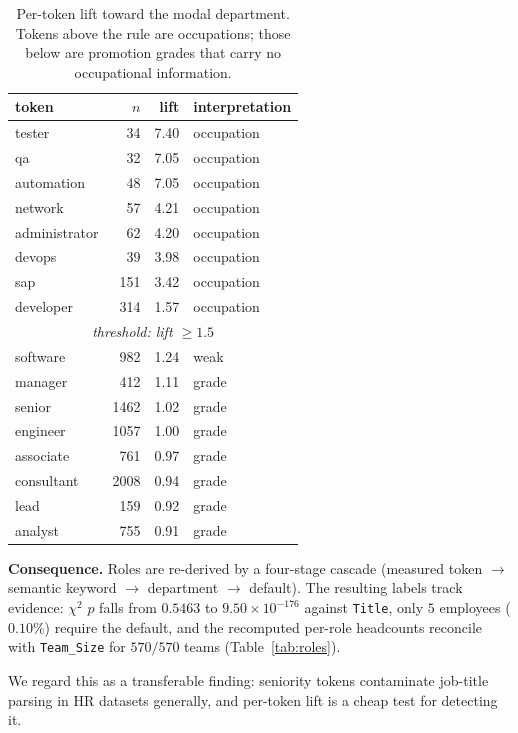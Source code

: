\documentclass[conference]{IEEEtran}
\begin{document}
\begin{table}[t]
\caption{Per-token lift toward the modal department. Tokens above the rule are
occupations; those below are promotion grades that carry no occupational
information.}
\label{tab:lift}
\centering\small
\begin{tabular}{lrrl}
\toprule
token & $n$ & lift & interpretation\\
\midrule
tester        &   34 & 7.40 & occupation\\
qa            &   32 & 7.05 & occupation\\
automation    &   48 & 7.05 & occupation\\
network       &   57 & 4.21 & occupation\\
administrator &   62 & 4.20 & occupation\\
devops        &   39 & 3.98 & occupation\\
sap           &  151 & 3.42 & occupation\\
developer     &  314 & 1.57 & occupation\\
\midrule
\multicolumn{4}{c}{\emph{threshold: lift $\geq 1.5$}}\\
\midrule
software      &  982 & 1.24 & weak\\
manager       &  412 & 1.11 & grade\\
senior        & 1462 & 1.02 & grade\\
engineer      & 1057 & 1.00 & grade\\
associate     &  761 & 0.97 & grade\\
consultant    & 2008 & 0.94 & grade\\
lead          &  159 & 0.92 & grade\\
analyst       &  755 & 0.91 & grade\\
\bottomrule
\end{tabular}
\end{table}

\noindent\textbf{Consequence.} Roles are re-derived by a four-stage cascade
(measured token $\to$ semantic keyword $\to$ department $\to$ default). The
resulting labels track evidence: $\chi^2$ $p$ falls from $0.5463$ to
$9.50\times10^{-176}$ against \texttt{Title}, only $5$ employees ($0.10\%$)
require the default, and the recomputed per-role headcounts reconcile with
\texttt{Team\_Size} for $570/570$ teams (Table~\ref{tab:roles}).

We regard this as a transferable finding: seniority tokens contaminate job-title
parsing in HR datasets generally, and per-token lift is a cheap test for
detecting it.
\end{document}
